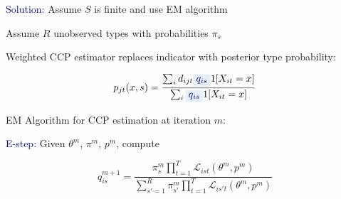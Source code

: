 \documentclass[aspectratio=169]{beamer}
\newcommand{\highlight}[1]{\colorbox{lightblue}{$\displaystyle\textcolor{navy}{#1}$}}
\begin{document}
\begin{frame}

\textcolor{navy}{Solution:} Assume $S$ is finite and use EM algorithm

\bigskip

Assume $R$ unobserved types with probabilities $\pi_s$

\bigskip


\end{frame}

\begin{frame}

Weighted CCP estimator replaces indicator with posterior type probability:

\bigskip

$$
p_{jt}(x,s) = \frac{\sum_i d_{ijt}\highlight{q_{is}}1[X_{it}=x]}{\sum_i \highlight{q_{is}}1[X_{it}=x]}
$$

\bigskip


\end{frame}

\begin{frame}

EM Algorithm for CCP estimation at iteration $m$:

\bigskip

\textcolor{navy}{E-step:} Given $\theta^m$, $\pi^m$, $p^m$, compute

$$
q_{is}^{m+1} = \frac{\pi_s^m\prod_{t=1}^T\mathcal{L}_{ist}(\theta^m, p^m)}{\sum_{s'=1}^R\pi_{s'}^m\prod_{t=1}^T\mathcal{L}_{is't}(\theta^m, p^m)}
$$

\bigskip


\end{frame}
\end{document}

